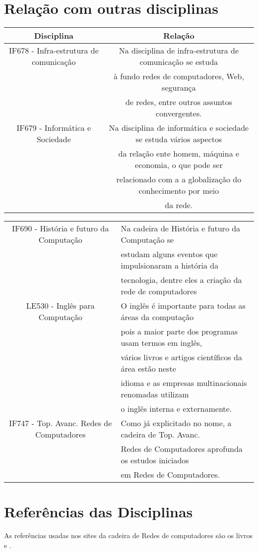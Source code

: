 \documentclass[10pt]{article}
\begin{document}
\section{Relação com outras disciplinas}
\begin{table}[!ht]
\centering
\begin{tabular}{|c|c|}
\hline
\textbf{Disciplina} & \textbf{Relação} \\\hline
IF678 - Infra-estrutura de comunicação & Na disciplina de infra-estrutura de comunicação se estuda \\& à fundo redes de computadores, Web, segurança \\& de redes, entre outros assuntos convergentes.
\\\hline
IF679 - Informática e Sociedade & Na disciplina de informática e sociedade se estuda vários aspectos\\& da relação ente homem, máquina e economia, o que pode ser\\& relacionado com a a globalização do conhecimento por meio \\&da rede.\\
\hline
\end{tabular}
\end{table}

\begin{table}[!ht]
\centering
\begin{tabular}{|c|l|}
\hline
IF690 - História e futuro da Computação & Na cadeira de História e futuro da Computação se \\& estudam alguns eventos que impulsionaram a história da\\& tecnologia, dentre eles a criação da rede de computadores
\\\hline
LE530 - Inglês para Computação &O inglês é importante para todas as áreas da computação\\& pois a maior parte dos programas usam termos em inglês,\\& vários livros e artigos científicos da área estão neste\\& idioma e as empresas multinacionais renomadas utilizam\\& o inglês interna e externamente. 
\\\hline
IF747 - Top. Avanc. Redes de Computadores &  Como já explicitado no nome, a cadeira de Top. Avanc.\\& Redes de Computadores aprofunda os estudos iniciados\\& em Redes de Computadores. \\
\hline
\end{tabular}
\end{table}
\section{Referências das Disciplinas}
As referências usadas nos sites da cadeira de Redes de computadores são os livros \cite{redes1} e \cite{redes2}.


\end{document}
